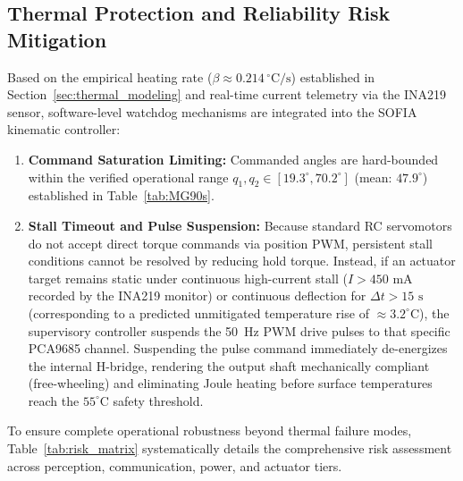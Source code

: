 \documentclass[lettersize,journal]{IEEEtran}
\begin{document}
	\subsection{Thermal Protection and Reliability Risk Mitigation}
	\label{sec:risk_mitigation}
	
	Based on the empirical heating rate ($\beta \approx 0.214\,^\circ\text{C/s}$) established in Section~\ref{sec:thermal_modeling} and real-time current telemetry via the INA219 sensor, software-level watchdog mechanisms are integrated into the SOFIA kinematic controller:
	\begin{enumerate}
		\item \textbf{Command Saturation Limiting:} Commanded angles are hard-bounded within the verified operational range $q_1, q_2 \in [19.3^\circ, 70.2^\circ]$ (mean: $47.9^\circ$) established in Table~\ref{tab:MG90s}.
		\item \textbf{Stall Timeout and Pulse Suspension:} Because standard RC servomotors do not accept direct torque commands via position PWM, persistent stall conditions cannot be resolved by reducing hold torque. Instead, if an actuator target remains static under continuous high-current stall ($I > 450\text{ mA}$ recorded by the INA219 monitor) or continuous deflection for $\Delta t > 15\text{ s}$ (corresponding to a predicted unmitigated temperature rise of $\approx 3.2^\circ\text{C}$), the supervisory controller suspends the 50~Hz PWM drive pulses to that specific PCA9685 channel. Suspending the pulse command immediately de-energizes the internal H-bridge, rendering the output shaft mechanically compliant (free-wheeling) and eliminating Joule heating before surface temperatures reach the $55^\circ\text{C}$ safety threshold.
	\end{enumerate}
	
	To ensure complete operational robustness beyond thermal failure modes, Table~\ref{tab:risk_matrix} systematically details the comprehensive risk assessment across perception, communication, power, and actuator tiers.
	
\end{document}
